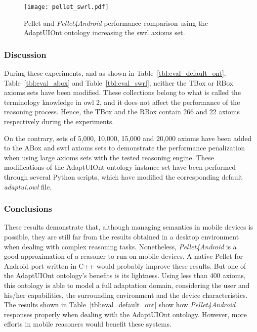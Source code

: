 \begin{figure}
\centering
\texttt{[image: pellet\_swrl.pdf]}
\caption{Pellet and \textit{Pellet4Android} performance comparison using the
AdaptUIOnt ontology increasing the \ac{swrl} axioms set.}
\label{fig:pellet_swrl}
\end{figure}

\subsubsection{Discussion}
\label{sec:performance_discussion}

During these experiments, and as shown in Table~\ref{tbl:eval_default_ont}, 
Table~\ref{tbl:eval_abox} and Table~\ref{tbl:eval_swrl}, neither the TBox or 
RBox axioms sets have been modified. These collections belong to what is called 
the terminology knowledge in \ac{owl} 2, and it does not affect the performance of 
the reasoning process. Hence, the TBox and the RBox contain 266 and 22 axioms 
respectively during the experiments.

On the contrary, sets of 5,000, 10,000, 15,000 and 20,000 axioms have been added
to the ABox and \ac{swrl} axioms sets to demonstrate the performance penalization
when using large axioms sets with the tested reasoning engine. These modifications 
of the AdaptUIOnt ontology instance set have been performed through several 
Python scripts, which have modified the corresponding default \textit{adaptui.owl} file.


\subsubsection{Conclusions}
\label{sec:performance_conclusions}

These results demonstrate that, although managing semantics in mobile devices is
possible, they are still far from the results obtained in a desktop environment 
when dealing with complex reasoning tasks. Nonetheless, \textit{Pellet4Android} 
is a good approximation of a reasoner to run on mobile devices. A native Pellet 
for Android port written in C++ would probably improve these results. But one of 
the AdaptUIOnt ontology's benefits is its lightness. Using less than 400 axioms, 
this ontology is able to model a full adaptation domain, considering the user and 
his/her capabilities, the surrounding environment and the device characteristics. 
The results shown in Table~\ref{tbl:eval_default_ont} show how \textit{Pellet4Android} 
responses properly when dealing with the AdaptUIOnt ontology. However, more efforts 
in mobile reasoners would benefit these systems.

